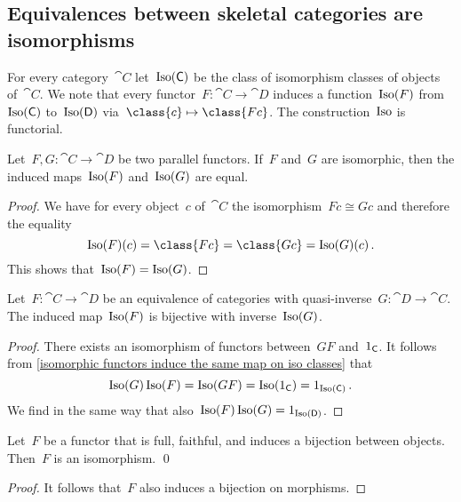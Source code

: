 \subsection*{Equivalences between skeletal categories are isomorphisms}

For every category~$\cat{C}$ let~$\operatorname{Iso}(\mathsf{C})$ be the class of isomorphism classes of objects of~$\cat{C}$.
We note that every functor~$F \colon \cat{C} \to \cat{D}$ induces a function~$\operatorname{Iso}(F)$ from~$\operatorname{Iso}(\mathsf{C})$ to~$\operatorname{Iso}(\mathsf{D})$ via~$\class{c} \mapsto \class{F c}$.
The construction~$\operatorname{Iso}$ is functorial.

\begin{lemma}
	\label{isomorphic functors induce the same map on iso classes}
	Let~$F, G \colon \cat{C} \to \cat{D}$ be two parallel functors.
	If~$F$ and~$G$ are isomorphic, then the induced maps~$\operatorname{Iso}(F)$ and~$\operatorname{Iso}(G)$ are equal.
\end{lemma}

\begin{proof}
	We have for every object~$c$ of~$\cat{C}$ the isomorphism~$F c ≅ G c$ and therefore the equality
	\[
		\Iso(F)(c)
		=
		\class{F c}
		=
		\class{G c}
		=
		\Iso(G)(c) \,.
	\]
	This shows that~$\operatorname{Iso}(F) = \operatorname{Iso}(G)$.
\end{proof}

\begin{proposition}
	\label{equivalence induces bijection between iso classes}
	Let~$F \colon \cat{C} \to \cat{D}$ be an equivalence of categories with quasi-inverse~$G \colon \cat{D} \to \cat{C}$.
	The induced map~$\operatorname{Iso}(F)$ is bijective with inverse~$\operatorname{Iso}(G)$.
\end{proposition}

\begin{proof}
	There exists an isomorphism of functors between~$G F$ and~$1_{\mathsf{C}}$.
	It follows from \cref{isomorphic functors induce the same map on iso classes} that
	\[
		\operatorname{Iso}(G) \operatorname{Iso}(F)
		=
		\operatorname{Iso}(G F)
		=
		\operatorname{Iso}( 1_{\mathsf{C}} )
		=
		1_{\operatorname{Iso}(\mathsf{C})} \,.
	\]
	We find in the same way that also~$\operatorname{Iso}(F) \operatorname{Iso}(G) = 1_{\operatorname{Iso}(\mathsf{D})}$.
\end{proof}

\begin{proposition}
	\label{full faithful and bijective is isomorphism}
	Let~$F$ be a functor that is full, faithful, and induces a bijection between objects.
	Then~$F$ is an isomorphism.
	\qed
\end{proposition}

\begin{proof}
	It follows that~$F$ also induces a bijection on morphisms.
\end{proof}

